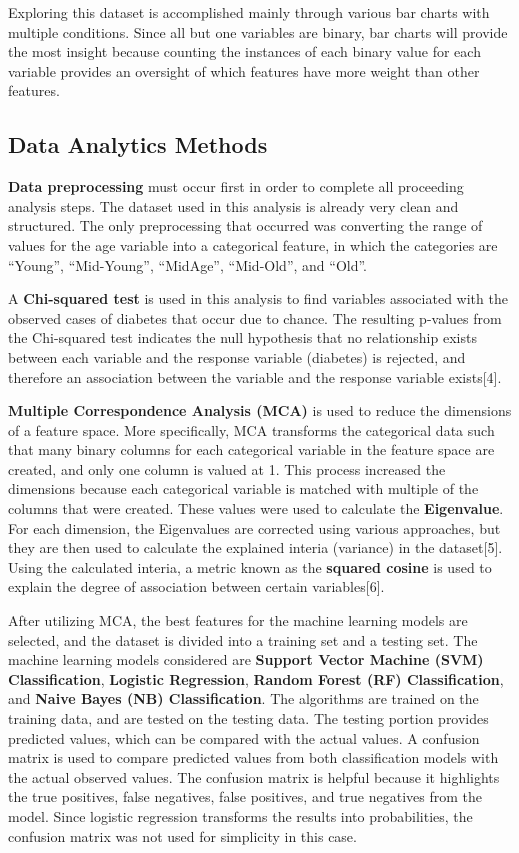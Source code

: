 \documentclass[
]{article}
\begin{document}
Exploring this dataset is accomplished mainly through various bar charts
with multiple conditions. Since all but one variables are binary, bar
charts will provide the most insight because counting the instances of
each binary value for each variable provides an oversight of which
features have more weight than other features.

\hypertarget{data-analytics-methods}{%
\subsection{Data Analytics Methods}\label{data-analytics-methods}}

\textbf{Data preprocessing} must occur first in order to complete all
proceeding analysis steps. The dataset used in this analysis is already
very clean and structured. The only preprocessing that occurred was
converting the range of values for the age variable into a categorical
feature, in which the categories are ``Young'', ``Mid-Young'',
``MidAge'', ``Mid-Old'', and ``Old''.

A \textbf{Chi-squared test} is used in this analysis to find variables
associated with the observed cases of diabetes that occur due to chance.
The resulting p-values from the Chi-squared test indicates the null
hypothesis that no relationship exists between each variable and the
response variable (diabetes) is rejected, and therefore an association
between the variable and the response variable exists{[}4{]}.

\textbf{Multiple Correspondence Analysis (MCA)} is used to reduce the
dimensions of a feature space. More specifically, MCA transforms the
categorical data such that many binary columns for each categorical
variable in the feature space are created, and only one column is valued
at 1. This process increased the dimensions because each categorical
variable is matched with multiple of the columns that were created.
These values were used to calculate the \textbf{Eigenvalue}. For each
dimension, the Eigenvalues are corrected using various approaches, but
they are then used to calculate the explained interia (variance) in the
dataset{[}5{]}. Using the calculated interia, a metric known as the
\textbf{squared cosine} is used to explain the degree of association
between certain variables{[}6{]}.

After utilizing MCA, the best features for the machine learning models
are selected, and the dataset is divided into a training set and a
testing set. The machine learning models considered are \textbf{Support
Vector Machine (SVM) Classification}, \textbf{Logistic Regression},
\textbf{Random Forest (RF) Classification}, and \textbf{Naive Bayes (NB)
Classification}. The algorithms are trained on the training data, and
are tested on the testing data. The testing portion provides predicted
values, which can be compared with the actual values. A confusion matrix
is used to compare predicted values from both classification models with
the actual observed values. The confusion matrix is helpful because it
highlights the true positives, false negatives, false positives, and
true negatives from the model. Since logistic regression transforms the
results into probabilities, the confusion matrix was not used for
simplicity in this case.
\end{document}
